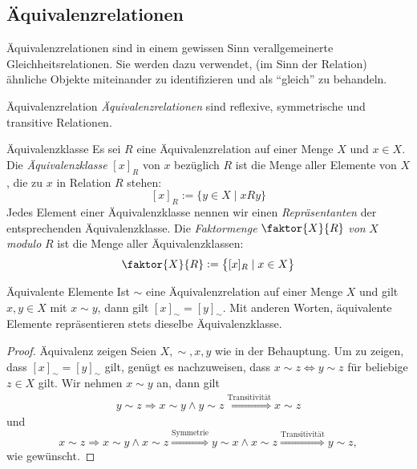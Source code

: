     \subsection*{Äquivalenzrelationen}

    Äquivalenzrelationen sind in einem gewissen Sinn verallgemeinerte Gleichheitsrelationen. Sie werden dazu verwendet, (im Sinn der Relation) ähnliche Objekte miteinander zu identifizieren und als ``gleich'' zu behandeln.

    \begin{definition}{Äquivalenzrelation}
    \textit{Äquivalenzrelationen} sind reflexive, symmetrische und transitive Relationen.
    \end{definition}


    \begin{definition}{Äquivalenzklasse}
    Es sei $R$ eine Äquivalenzrelation auf einer Menge $X$ und $x\in X$. Die \textit{Äquivalenzklasse} $[x]_R$ von $x$ bezüglich $R$ ist die Menge aller Elemente von $X$, die zu $x$ in Relation $R$ stehen:
    \[
    [x]_R:=\{y\in X\mid xRy \}
    \]
    Jedes Element einer Äquivalenzklasse nennen wir einen \textit{Repräsentanten} der entsprechenden Äquivalenzklasse. Die \textit{Faktormenge} $\faktor{X}{R}$ \textit{von} $X$ \textit{modulo} $R$ ist die Menge aller Äquivalenzklassen:
    \[
    \faktor{X}{R}:=\big\{ [x]_R\mid x\in X \big\}
    \]
    \end{definition}

    
    \begin{lemma}{Äquivalente Elemente}
    Ist $\sim $ eine Äquivalenzrelation auf einer Menge $X$ und gilt $x,y\in X$ mit $x\sim y$, dann gilt $[x]_\sim=[y]_\sim$. Mit anderen Worten, äquivalente Elemente repräsentieren stets dieselbe Äquivalenzklasse.
    \end{lemma}
    
    \begin{proof}{Äquivalenz zeigen}
    Seien $X,\sim,x,y$ wie in der Behauptung. Um zu zeigen, dass $[x]_\sim=[y]_\sim$ gilt, genügt es nachzuweisen, dass $x\sim z\Leftrightarrow y\sim z$ für beliebige $z\in X$ gilt. Wir nehmen $x\sim y$ an, dann gilt
    \begin{align*}
    y\sim z\Rightarrow x\sim y\land y\sim z \stackrel{\text{Transitivität}}{\Longrightarrow} x\sim z
    \end{align*}
    und
    \[
    x\sim z\Rightarrow x\sim y\land x\sim z\stackrel{\text{Symmetrie}}{\Longrightarrow} y\sim x\land x\sim z\stackrel{\text{Transitivität}}{\Longrightarrow} y\sim z,
    \]
    wie gewünscht.
    \end{proof}
    
